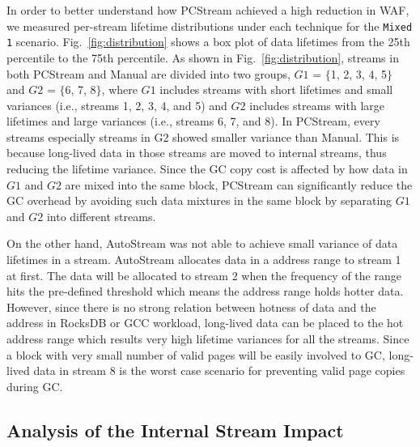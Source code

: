 In order to better understand how \textsf{\small PCStream} achieved a high reduction in WAF, 
we measured per-stream lifetime distributions under each 
technique for the \texttt{Mixed 1} scenario.
Fig.~\ref{fig:distribution} shows a box plot of data lifetimes from the 
25th percentile to the 75th percentile.
As shown in Fig.~\ref{fig:distribution}, 
streams in both \textsf{\small PCStream} and Manual are divided into two groups, 
$G1$ = $\{$1, 2, 3, 4, 5$\}$ and $G2$ = $\{$6, 7, 8$\}$, 
where $G1$ includes streams with short lifetimes and small variances 
(i.e., streams 1, 2, 3, 4, and 5) 
and $G2$ includes streams with large lifetimes and large variances (i.e., streams 6, 7, and 8).  
In PCStream, every streams especially streams in G2 showed smaller variance than 
Manual.
This is because long-lived data in those streams are moved to internal streams, thus 
reducing the lifetime variance.
Since the GC copy cost is affected by how data in $G1$ and $G2$ are mixed into the same block, 
\textsf{\small PCStream} can significantly reduce the GC overhead 
by avoiding such data mixtures in the same block by separating $G1$ and $G2$ into different streams. 

On the other hand, AutoStream was not able to achieve small variance of data lifetimes in a stream.
AutoStream allocates data in a address range to stream 1 at first.
The data will be allocated to stream 2 when the frequency of the range hits the 
pre-defined threshold which means the address range holds hotter data.
However, since there is no strong relation between hotness of data and the address in RocksDB
or GCC workload, 
long-lived data can be placed to the hot address range which results 
very high lifetime variances for all the streams.
Since a block with very small number of valid pages will be easily involved to GC,
long-lived data in stream 8 is the worst case scenario 
for preventing valid page copies during GC.

\subsection{Analysis of the Internal Stream Impact}

